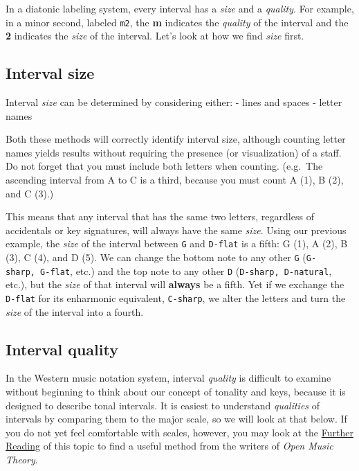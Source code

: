 \documentclass{book}
\begin{document}
In a diatonic labeling system, every interval has a \emph{size} and a
\emph{quality}. For example, in a minor second, labeled \texttt{m2}, the
\textbf{m} indicates the \emph{quality} of the interval and the \textbf{2}
indicates the \emph{size} of the interval. Let's look at how we find
\emph{size} first.

\hypertarget{interval-size}{%
\subsection{Interval size}\label{interval-size}}

Interval \emph{size} can be determined by considering either: - lines and
spaces - letter names

Both these methods will correctly identify interval size, although counting
letter names yields results without requiring the presence (or visualization)
of a staff. Do not forget that you must include both letters when counting.
(e.g.~The ascending interval from A to C is a third, because you must count A
(1), B (2), and C (3).)

This means that any interval that has the same two letters, regardless of
accidentals or key signatures, will always have the same \emph{size}. Using
our previous example, the \emph{size} of the interval between \texttt{G} and
\texttt{D-flat} is a fifth: G (1), A (2), B (3), C (4), and D (5). We can
change the bottom note to any other \texttt{G} (\texttt{G-sharp,\ G-flat},
etc.) and the top note to any other \texttt{D} (\texttt{D-sharp,\ D-natural},
etc.), but the \emph{size} of that interval will \textbf{always} be a fifth.
Yet if we exchange the \texttt{D-flat} for its enharmonic equivalent,
\texttt{C-sharp}, we alter the letters and turn the \emph{size} of the
interval into a fourth.

\hypertarget{interval-quality}{%
\subsection{Interval quality}\label{interval-quality}}

In the Western music notation system, interval \emph{quality} is difficult to
examine without beginning to think about our concept of tonality and keys,
because it is designed to describe tonal intervals. It is easiest to
understand \emph{qualities} of intervals by comparing them to the major scale,
so we will look at that below. If you do not yet feel comfortable with scales,
however, you may look at the
\href{02-int-scales-keys/a2-intervals.html}{Further Reading} of this topic to
find a useful method from the writers of \emph{Open Music Theory}.
\end{document}
